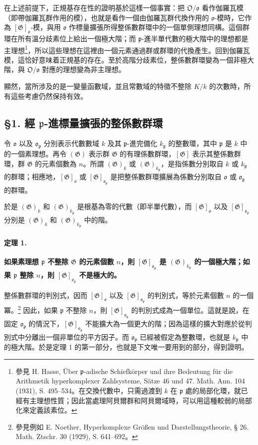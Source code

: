\documentclass[11pt]{article}
\newcommand{\frakO}{\mathfrak O}
\newcommand{\frako}{\mathfrak o}
\newcommand{\frakp}{\mathfrak p}
\newcommand{\Gg}{\mathfrak G}
\newcommand{\srcemph}[1]{\textbf{#1}}
\begin{document}
在上述前提下，正規基存在性的證明基於這樣一個事實：把 \(\frakO/\frako\) 看作伽羅瓦模（即帶伽羅瓦群作用的模），也就是看作一個由伽羅瓦群代換作用的 \(\frako\)-模時，它作為 \([\Gg]_{\frako}\)-模，與用 \(\frako\) 作標量擴張所得整係數群環中的一個單側理想同構。這個群環在所有溫分歧素位上給出一個極大階；而 \(\frakp\)-進半單代數的極大階中的理想都是主理想\footnote{參見 H. Hasse, Über \(\frakp\)-adische Schiefkörper und ihre Bedeutung für die Arithmetik hyperkomplexer Zahlsysteme, Sätze 46 und 47. Math. Ann. 104 (1931), S. 495--534。在交換代數中，只需過渡到 \(k\) 在 \(\frakp\) 處的局部化環，就已經有主理想性質；因此當處理阿貝爾群和阿貝爾域時，可以用這種較弱的局部化來定義該素位。}，所以這些理想在這裡由一個元素通過群或群環的代換產生。回到伽羅瓦模，這恰好意味着正規基的存在。至於高階分歧素位，整係數群環變為一個非極大階，與 \(\frakO/\frako\) 對應的理想變為非主理想。

顯然，當所涉及的是一變量函數域，並且常數域的特徵不整除 \(K/k\) 的次數時，所有這些考慮仍然保持有效。

\subsection*{§1. 經 \(\frakp\)-進標量擴張的整係數群環}

令 \(\frako\) 以及 \(\frako_\frakp\) 分別表示代數數域 \(k\) 及其 \(\frakp\)-進完備化 \(k_\frakp\) 的整數環，其中 \(\frakp\) 是 \(k\) 中的一個素理想。再令 \((\Gg)\) 表示群 \(\Gg\) 的有理係數群環，\([\Gg]\) 表示其整係數群環，群 \(\Gg\) 的元素個數為 \(n\)。所謂 \((\Gg)_k\) 或 \((\Gg)_{k_\frakp}\)，是指係數分別取自 \(k\) 或 \(k_\frakp\) 的群環；相應地，\([\Gg]_\frako\) 或 \([\Gg]_{\frako_\frakp}\) 是把整係數群環擴展為係數分別取自 \(\frako\) 或 \(\frako_\frakp\) 的群環。

於是 \((\Gg)_k\) 和 \((\Gg)_{k_\frakp}\) 是根基為零的代數（即半單代數），而 \([\Gg]_\frako\) 以及 \([\Gg]_{\frako_\frakp}\) 分別是 \((\Gg)_k\) 和 \((\Gg)_{k_\frakp}\) 中的階。

\paragraph{定理 1.}
\srcemph{如果素理想 \(\frakp\) 不整除 \(\Gg\) 的元素個數 \(n\)，則 \([\Gg]_{\frako_\frakp}\) 是 \((\Gg)_{k_\frakp}\) 的一個極大階；如果 \(\frakp\) 整除 \(n\)，則 \([\Gg]_{\frako_\frakp}\) 不是極大的。}

整係數群環的判別式，因而 \([\Gg]_\frako\) 以及 \([\Gg]_{\frako_\frakp}\) 的判別式，等於元素個數 \(n\) 的一個冪。\footnote{參見例如 E. Noether, Hyperkomplexe Größen und Darstellungstheorie, § 26. Math. Ztschr. 30 (1929), S. 641--692。} 因此，如果 \(\frakp\) 不整除 \(n\)，則 \([\Gg]_{\frako_\frakp}\) 的判別式成為一個單位。這就是說，在固定 \(\frako_\frakp\) 的情況下，\([\Gg]_{\frako_\frakp}\) 不能擴大為一個更大的階；因為這樣的擴大對應於從判別式中分離出一個非單位的平方因子。而 \(\frako_\frakp\) 已經被假定為整數環，也就是 \(k_\frakp\) 中的極大階。於是定理 1 的第一部分，也就是下文唯一要用到的部分，得到證明。
\end{document}
